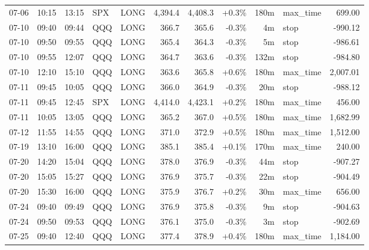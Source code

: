 \documentclass[11pt,a4paper,twoside]{article}
\begin{document}
\begin{center}
\begin{longtable}{>{\color{txtmain}}l l l l l r r r r >{\color{txtmain}}l r}
07-06 & 10:15 & 13:15 & SPX & LONG & 4,394.4 & 4,408.3 & \textcolor{wingreen}{+0.3\%} & 180m & max\_time & \textcolor{wingreen}{699.00} \\
07-10 & 09:40 & 09:44 & QQQ & LONG & 366.7 & 365.6 & \textcolor{lossred}{-0.3\%} & 4m & stop & \textcolor{lossred}{-990.12} \\
07-10 & 09:50 & 09:55 & QQQ & LONG & 365.4 & 364.3 & \textcolor{lossred}{-0.3\%} & 5m & stop & \textcolor{lossred}{-986.61} \\
07-10 & 09:55 & 12:07 & QQQ & LONG & 364.7 & 363.6 & \textcolor{lossred}{-0.3\%} & 132m & stop & \textcolor{lossred}{-984.80} \\
07-10 & 12:10 & 15:10 & QQQ & LONG & 363.6 & 365.8 & \textcolor{wingreen}{+0.6\%} & 180m & max\_time & \textcolor{wingreen}{2,007.01} \\
07-11 & 09:45 & 10:05 & QQQ & LONG & 366.0 & 364.9 & \textcolor{lossred}{-0.3\%} & 20m & stop & \textcolor{lossred}{-988.12} \\
07-11 & 09:45 & 12:45 & SPX & LONG & 4,414.0 & 4,423.1 & \textcolor{wingreen}{+0.2\%} & 180m & max\_time & \textcolor{wingreen}{456.00} \\
07-11 & 10:05 & 13:05 & QQQ & LONG & 365.2 & 367.0 & \textcolor{wingreen}{+0.5\%} & 180m & max\_time & \textcolor{wingreen}{1,682.99} \\
07-12 & 11:55 & 14:55 & QQQ & LONG & 371.0 & 372.9 & \textcolor{wingreen}{+0.5\%} & 180m & max\_time & \textcolor{wingreen}{1,512.00} \\
07-19 & 13:10 & 16:00 & QQQ & LONG & 385.1 & 385.4 & \textcolor{wingreen}{+0.1\%} & 170m & max\_time & \textcolor{wingreen}{240.00} \\
07-20 & 14:20 & 15:04 & QQQ & LONG & 378.0 & 376.9 & \textcolor{lossred}{-0.3\%} & 44m & stop & \textcolor{lossred}{-907.27} \\
07-20 & 15:05 & 15:27 & QQQ & LONG & 376.9 & 375.7 & \textcolor{lossred}{-0.3\%} & 22m & stop & \textcolor{lossred}{-904.49} \\
07-20 & 15:30 & 16:00 & QQQ & LONG & 375.9 & 376.7 & \textcolor{wingreen}{+0.2\%} & 30m & max\_time & \textcolor{wingreen}{656.00} \\
07-24 & 09:40 & 09:49 & QQQ & LONG & 376.9 & 375.8 & \textcolor{lossred}{-0.3\%} & 9m & stop & \textcolor{lossred}{-904.63} \\
07-24 & 09:50 & 09:53 & QQQ & LONG & 376.1 & 375.0 & \textcolor{lossred}{-0.3\%} & 3m & stop & \textcolor{lossred}{-902.69} \\
07-25 & 09:40 & 12:40 & QQQ & LONG & 377.4 & 378.9 & \textcolor{wingreen}{+0.4\%} & 180m & max\_time & \textcolor{wingreen}{1,184.00} \\

\end{longtable}
\end{center}
\end{document}

